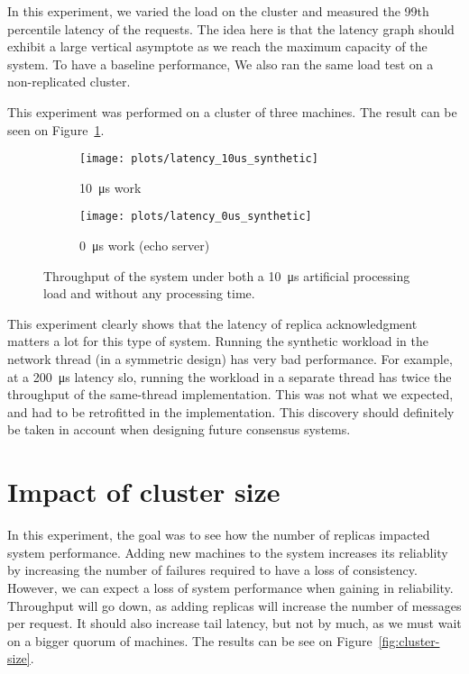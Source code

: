 In this experiment, we varied the load on the cluster and measured the 99th percentile latency of the requests.
The idea here is that the latency graph should exhibit a large vertical asymptote as we reach the maximum capacity of the system. 
To have a baseline performance, We also ran the same load test on a non-replicated cluster.

This experiment was performed on a cluster of three machines.
The result can be seen on Figure~\ref{fig:latency-throughput}.

\begin{figure}[p]
    \centering
    \begin{subfigure}[t]{0.8\textwidth}
        \texttt{[image: plots/latency\_10us\_synthetic]}
        \caption{\SI{10}{\micro\second} work}
    \end{subfigure}

    \begin{subfigure}[t]{0.8\textwidth}
        \texttt{[image: plots/latency\_0us\_synthetic]}
        \caption{\SI{0}{\micro\second} work (echo server)}
    \end{subfigure}
    \caption{
        Throughput of the system under both a \SI{10}{\micro\second} artificial processing load and without any processing time.
        \label{fig:latency-throughput}
    }
\end{figure}

This experiment clearly shows that the latency of replica acknowledgment matters a lot for this type of system.
Running the synthetic workload in the network thread (in a symmetric design) has very bad performance.
For example, at a \SI{200}{\micro\second} latency \gls{slo}, running the workload in a separate thread has twice the throughput of the same-thread implementation.
This was not what we expected, and had to be retrofitted in the implementation.
This discovery should definitely be taken in account when designing future consensus systems.

\section{Impact of cluster size}


In this experiment, the goal was to see how the number of replicas impacted system performance.
Adding new machines to the system increases its reliablity by increasing the number of failures required to have a loss of consistency.
However, we can expect a loss of system performance when gaining in reliability.
Throughput will go down, as adding replicas will increase the number of messages per request.
It should also increase tail latency, but not by much, as we must wait on a bigger quorum of machines.
The results can be see on Figure~\ref{fig:cluster-size}.

